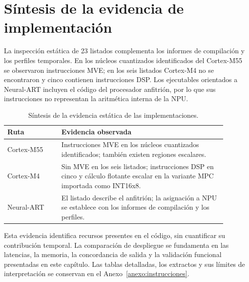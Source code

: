 \FloatBarrier
\section{Síntesis de la evidencia de implementación}
La inspección estática de 23 listados complementa los informes de compilación y los perfiles temporales. En los núcleos cuantizados identificados del Cortex-M55 se observaron instrucciones MVE; en los seis listados Cortex-M4 no se encontraron y cinco contienen instrucciones DSP. Los ejecutables orientados a Neural-ART incluyen el código del procesador anfitrión, por lo que sus instrucciones no representan la aritmética interna de la NPU.

\begin{table}[htbp]
\centering\small
\caption{Síntesis de la evidencia estática de las implementaciones.}
\begin{tabular}{p{0.22\linewidth}p{0.67\linewidth}}
\hline
Ruta & Evidencia observada \\\hline
Cortex-M55 & Instrucciones MVE en los núcleos cuantizados identificados; también existen regiones escalares. \\
Cortex-M4 & Sin MVE en los seis listados; instrucciones DSP en cinco y cálculo flotante escalar en la variante MPC importada como INT16x8. \\
Neural-ART & El listado describe el anfitrión; la asignación a NPU se establece con los informes de compilación y los perfiles. \\\hline
\end{tabular}
\end{table}

Esta evidencia identifica recursos presentes en el código, sin cuantificar su contribución temporal. La comparación de despliegue se fundamenta en las latencias, la memoria, la concordancia de salida y la validación funcional presentadas en este capítulo. Las tablas detalladas, los extractos y sus límites de interpretación se conservan en el Anexo~\ref{anexo:instrucciones}.

